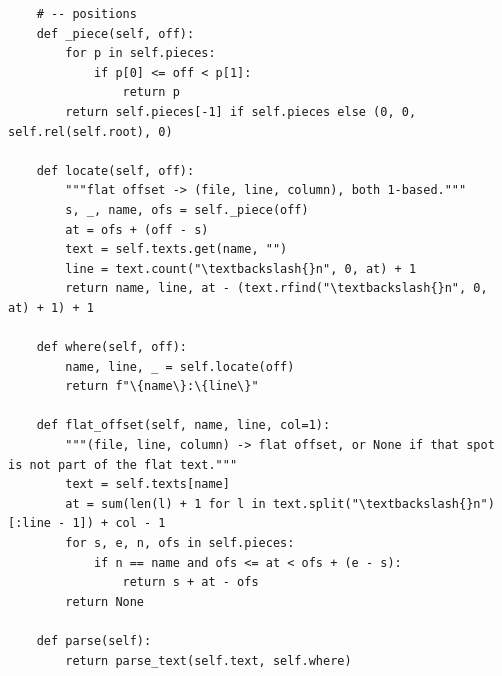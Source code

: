 \documentclass[10pt,a4paper]{article}
\begin{document}
\begin{Verbatim}
    # -- positions
    def _piece(self, off):
        for p in self.pieces:
            if p[0] <= off < p[1]:
                return p
        return self.pieces[-1] if self.pieces else (0, 0, self.rel(self.root), 0)

    def locate(self, off):
        """flat offset -> (file, line, column), both 1-based."""
        s, _, name, ofs = self._piece(off)
        at = ofs + (off - s)
        text = self.texts.get(name, "")
        line = text.count("\textbackslash{}n", 0, at) + 1
        return name, line, at - (text.rfind("\textbackslash{}n", 0, at) + 1) + 1

    def where(self, off):
        name, line, _ = self.locate(off)
        return f"\{name\}:\{line\}"

    def flat_offset(self, name, line, col=1):
        """(file, line, column) -> flat offset, or None if that spot is not part of the flat text."""
        text = self.texts[name]
        at = sum(len(l) + 1 for l in text.split("\textbackslash{}n")[:line - 1]) + col - 1
        for s, e, n, ofs in self.pieces:
            if n == name and ofs <= at < ofs + (e - s):
                return s + at - ofs
        return None

    def parse(self):
        return parse_text(self.text, self.where)


\end{Verbatim}
\end{document}

